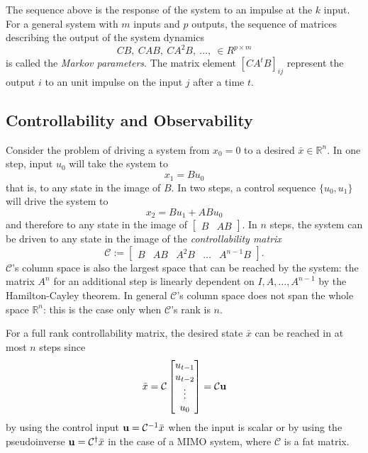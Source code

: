 The sequence above is the response of the system to an impulse at the $k$ input. For a general system with $m$ inputs and $p$ outputs, the sequence of matrices describing the output of the system dynamics
\begin{equation}
  \label{eq:markov-parameters}
  CB,\ CAB,\ CA^2B,\ \ldots,\ \in R^{p\times m}
\end{equation}
is called the \emph{Markov parameters}. The matrix element $\left[CA^tB\right]_{ij}$ represent the output $i$ to an unit impulse on the input $j$ after a time $t$.

\subsection{Controllability and Observability}
\label{sec:controllability-observability}

Consider the problem of driving a system from $x_0=0$ to a desired $\bar{x}\in \mathbb{R}^n$. In one step, input $u_0$ will take the system to
\begin{equation*}
  x_1 = Bu_0
\end{equation*}
that is, to any state in the image of $B$. In two steps, a control sequence $\{u_0,u_1\}$ will drive the system to
\begin{equation*}
  x_2 = Bu_1 + ABu_0
\end{equation*}
and therefore to any state in the image of $\begin{bmatrix}B & AB\end{bmatrix}$. In $n$ steps, the system can be driven to any state in the image of the \emph{controllability matrix}
\begin{equation}
  \label{eq:controllability-matrix}
  \mathcal{C} :=
  \begin{bmatrix}
    B & AB & A^2B & \ldots & A^{n-1}B
  \end{bmatrix}.
\end{equation}
$\mathcal{C}$'s column space is also the largest space that can be reached by the system: the matrix $A^n$ for an additional step is linearly dependent on $I,A,\ldots, A^{n-1}$ by the Hamilton-Cayley theorem. In general $\mathcal{C}$'s column space does not span the whole space $\mathbb{R}^n$: this is the case only when $\mathcal{C}$'s rank is $n$.

For a full rank controllability matrix, the desired state $\bar{x}$ can be reached in at most $n$ steps since
\begin{equation*}
  \bar{x} = \mathcal{C}
  \begin{bmatrix}
    u_{t-1} \\ u_{t-2} \\ \vdots \\ u_0
  \end{bmatrix} = \mathcal{C} \boldsymbol{\mathrm{u}}
\end{equation*}
by using the control input $\boldsymbol{\mathrm{u}} = \mathcal{C}^{-1}\bar{x}$ when the input is scalar or by using the pseudoinverse $\boldsymbol{\mathrm{u}} = \mathcal{C}^\dagger\bar{x}$ in the case of a MIMO system, where $\mathcal{C}$ is a fat matrix.

